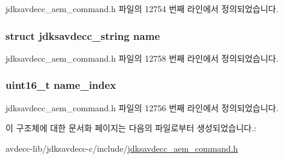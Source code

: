 jdksavdecc\+\_\+aem\+\_\+command.\+h 파일의 12754 번째 라인에서 정의되었습니다.

\subsubsection[{\texorpdfstring{name}{name}}]{\setlength{\rightskip}{0pt plus 5cm}struct {\bf jdksavdecc\+\_\+string} name}\hypertarget{structjdksavdecc__aem__command__set__name__response_a7e615b51b7768e9b59bfa450051e0f8e}{}\label{structjdksavdecc__aem__command__set__name__response_a7e615b51b7768e9b59bfa450051e0f8e}


jdksavdecc\+\_\+aem\+\_\+command.\+h 파일의 12758 번째 라인에서 정의되었습니다.

\subsubsection[{\texorpdfstring{name\+\_\+index}{name_index}}]{\setlength{\rightskip}{0pt plus 5cm}uint16\+\_\+t name\+\_\+index}\hypertarget{structjdksavdecc__aem__command__set__name__response_a898a74ada625e0b227dadb02901404e6}{}\label{structjdksavdecc__aem__command__set__name__response_a898a74ada625e0b227dadb02901404e6}


jdksavdecc\+\_\+aem\+\_\+command.\+h 파일의 12756 번째 라인에서 정의되었습니다.



이 구조체에 대한 문서화 페이지는 다음의 파일로부터 생성되었습니다.\+:\begin{DoxyCompactItemize}
\item 
avdecc-\/lib/jdksavdecc-\/c/include/\hyperlink{jdksavdecc__aem__command_8h}{jdksavdecc\+\_\+aem\+\_\+command.\+h}\end{DoxyCompactItemize}
